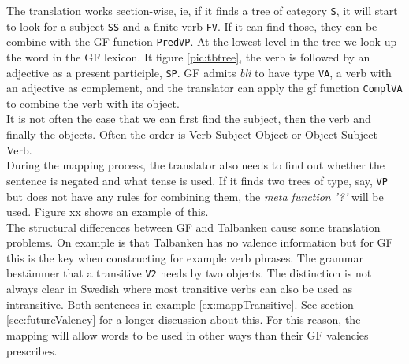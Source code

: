 \documentclass{report}
\begin{document}

The translation works section-wise, ie, if it finds a tree of category \verb|S|,
it will start to look for a subject \verb|SS| and a finite verb \verb|FV|. If it
can find those, they can be combine with the GF function \verb|PredVP|.
At the lowest level in the tree we look up the word in the GF lexicon.
It figure \ref{pic:tbtree}, the verb is followed by an adjective as a present
participle, \verb|SP|. GF admits \emph{bli} to have type \verb|VA|, a verb
with an adjective as complement, and the translator can apply the gf function
\verb|ComplVA| to combine the verb with its object. \\
It is not often the case that we can first find the subject, then the verb and 
finally the objects. Often the order is Verb-Subject-Object or Object-Subject-Verb. \\
During the mapping process, the translator also needs to find out whether the sentence is
negated and what tense is used. If it finds two trees of type, say, \verb|VP| but does not
have any rules for combining them, the \textit{meta function} \emph{'?'} will be used. 
Figure xx shows an example of this.\\


The structural differences between GF and Talbanken cause some translation problems.
On example is that Talbanken has no valence information but for GF this is the key when
constructing for example verb phrases. The grammar bestämmer that a transitive \verb|V2|
needs by two objects. The distinction is not always clear in Swedish where 
most transitive verbs can also be used as intransitive. Both sentences in
example \ref{ex:mappTransitive}.
 \label{ex:mappTransitive}
See section \ref{sec:futureValency} for a longer discussion about this.
For this reason, the mapping will allow words to be used in other ways than their
GF valencies prescribes.
\end{document}
